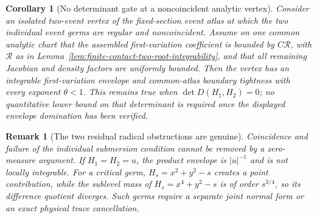 \documentclass[11pt]{article}
\newtheorem{corollary}[theorem]{Corollary}
\newtheorem{remark}[theorem]{Remark}
\begin{document}
\begin{corollary}[No determinant gate at a noncoincident analytic vertex]
\label{cor:noncoincident-vertex-tightness}
Consider an isolated two-event vertex of the fixed-section event atlas at
which the two individual event germs are regular and noncoincident.  Assume
on one common analytic chart that the assembled first-variation coefficient
is bounded by $C\mathcal R$, with $\mathcal R$ as in
Lemma~\ref{lem:finite-contact-two-root-integrability}, and that all remaining
Jacobian and density factors are uniformly bounded.  Then the vertex has an
integrable first-variation envelope and common-atlas boundary tightness with
every exponent $\theta<1$.  This remains true when
$\det D(H_1,H_2)=0$; no quantitative lower bound on that determinant is
required once the displayed envelope domination has been verified.
\end{corollary}

\begin{remark}[The two residual radical obstructions are genuine]
\label{rem:coincident-critical-radical-obstructions}
Coincidence and failure of the individual submersion condition cannot be
removed by a zero-measure argument.  If $H_1=H_2=u$, the product envelope
is $|u|^{-1}$ and is not locally integrable.  For a critical germ,
$H_s=x^2+y^2-s$ creates a point contribution, while the sublevel mass of
$H_s=x^4+y^2-s$ is of order $s^{3/4}$, so its difference quotient diverges.
Such germs require a separate joint normal form or an exact physical trace
cancellation.
\end{remark}
\end{document}
